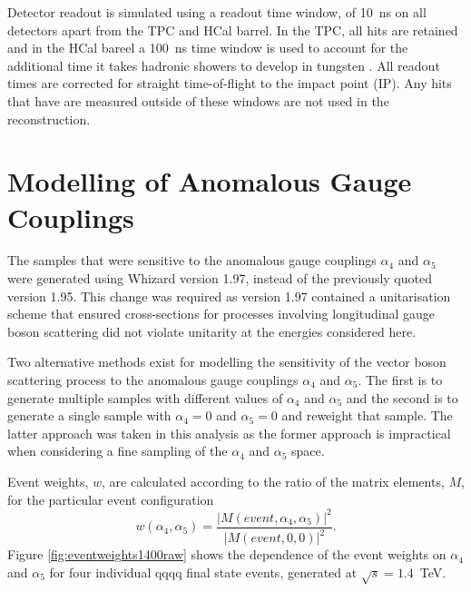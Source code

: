 Detector readout is simulated using a readout time window, of 10~ns on all detectors apart from the TPC and HCal barrel.  In the TPC, all hits are retained and in the HCal bareel a 100~ns time window is used to account for the additional time it takes hadronic showers to develop in tungsten \cite{Linssen:2012hp}.  All readout times are corrected for straight time-of-flight to the impact point (IP).  Any hits that have are measured outside of these windows are not used in the reconstruction.   
 

\section{Modelling of Anomalous Gauge Couplings}
\label{sec:modellingofanomalouscouplings}
The samples that were sensitive to the anomalous gauge couplings $\alpha_{4}$ and $\alpha_{5}$ were generated using Whizard version 1.97, instead of the previously quoted version 1.95.  This change was required as version 1.97 contained a unitarisation scheme that ensured cross-sections for processes involving longitudinal gauge boson scattering did not violate unitarity at the energies considered here.  

Two alternative methods exist for modelling the sensitivity of the vector boson scattering process to the anomalous gauge couplings $\alpha_{4}$ and $\alpha_{5}$.  The first is to generate multiple samples with different values of $\alpha_{4}$ and $\alpha_{5}$ and the second is to generate a single sample with $\alpha_{4} = 0$ and $\alpha_{5} = 0$ and reweight that sample.  The latter approach was taken in this analysis as the former approach is impractical when considering a fine sampling of the $\alpha_{4}$ and $\alpha_{5}$ space.

Event weights, $w$, are calculated according to the ratio of the matrix elements, $M$, for the particular event configuration \cite{WhizardManual}
%
\begin{equation}
w(\alpha_{4},\alpha_{5}) = \frac{|M(event,\alpha_{4},\alpha_{5})|^{2}}{|M(event,0,0)|^{2}} \text{.}
\end{equation}
%
Figure \ref{fig:eventweights1400raw} shows the dependence of the event weights on $\alpha_{4}$ and $\alpha_{5}$ for four individual \nu{\nu}qqqq final state events, generated at $\sqrt{s}=1.4$~TeV.

